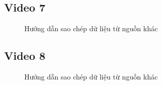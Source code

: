 \documentclass{article}
\begin{document}
\subsection{Video 7}
\begin{figure}[H]
\centering
\caption{Hướng dẫn sao chép dữ liệu từ nguồn khác}
\end{figure}
\subsection{Video 8}
\begin{figure}[H]
\centering
\caption{Hướng dẫn sao chép dữ liệu từ nguồn khác}
\end{figure}







\end{document}
